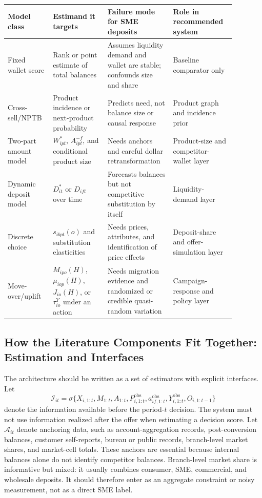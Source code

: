 \documentclass[11pt]{article}
\begin{document}
\begin{table}[htbp]
\centering
\footnotesize
\begin{tabular}{@{}
  >{\raggedright\arraybackslash}p{0.18\linewidth}
  >{\raggedright\arraybackslash}p{0.22\linewidth}
  >{\raggedright\arraybackslash}p{0.26\linewidth}
  >{\raggedright\arraybackslash}p{0.22\linewidth}
@{}}
\toprule
Model class & Estimand it targets & Failure mode for SME deposits & Role in recommended system \\
\midrule
Fixed wallet score & Rank or point estimate of total balances & Assumes liquidity demand and wallet are stable; confounds size and share & Baseline comparator only \\
Cross-sell/NPTB & Product incidence or next-product probability & Predicts need, not balance size or causal response & Product graph and incidence prior \\
Two-part amount model & $W_{ipt}^{*}$, $A_{ipt}^{-f}$, and conditional product size & Needs anchors and careful dollar retransformation & Product-size and competitor-wallet layer \\
Dynamic deposit model & $D_{it}^{*}$ or $D_{ift}$ over time & Forecasts balances but not competitive substitution by itself & Liquidity-demand layer \\
Discrete choice & $s_{ibpt}(o)$ and substitution elasticities & Needs prices, attributes, and identification of price effects & Deposit-share and offer-simulation layer \\
Move-over/uplift & $M_{ipo}(H)$, $\mu_{iop}(H)$, $J_{io}(H)$, or $\tau_{io}^{Y}$ under an action & Needs migration evidence and randomized or credible quasi-random variation & Campaign-response and policy layer \\
\bottomrule
\end{tabular}
\end{table}

\subsection{How the Literature Components Fit Together: Estimation and Interfaces}

The architecture should be written as a set of estimators with explicit
interfaces. Let
\[
  \mathcal{I}_{it}
  =
  \sigma\{X_{i,1:t},M_{1:t},A_{1:t},P_{i,1:t}^{\mathrm{obs}},
  a_{if,1:t}^{\mathrm{obs}},Y_{i,1:t}^{\mathrm{obs}},O_{i,1:t-1}\}
\]
denote the information available before the period-$t$ decision. The system
must not use information realized after the offer when estimating a decision
score. Let $\mathcal{A}_{it}$ denote anchoring data, such as account-aggregation
records, post-conversion balances, customer self-reports, bureau or public
records, branch-level market shares, and market-cell totals. These anchors are
essential because internal balances alone do not identify competitor balances.
Branch-level market share is informative but mixed: it usually combines
consumer, SME, commercial, and wholesale deposits. It should therefore enter as
an aggregate constraint or noisy measurement, not as a direct SME label.
\end{document}
